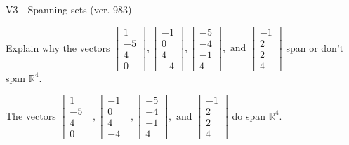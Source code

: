 \begin{exercise}
  \begin{exerciseTitle}V3 - Spanning sets (ver. 983)\end{exerciseTitle}
  \begin{exerciseStatement}
    Explain why the vectors \(\left[\begin{array}{r}
1 \\
-5 \\
4 \\
0
\end{array}\right] , \left[\begin{array}{r}
-1 \\
0 \\
4 \\
-4
\end{array}\right] , \left[\begin{array}{r}
-5 \\
-4 \\
-1 \\
4
\end{array}\right] , \text{ and } \left[\begin{array}{r}
-1 \\
2 \\
2 \\
4
\end{array}\right]\) span or don't span \(\mathbb{R}^4\). 
	


  \end{exerciseStatement}
  \begin{exerciseAnswer}
   The vectors \(\left[\begin{array}{r}
1 \\
-5 \\
4 \\
0
\end{array}\right] , \left[\begin{array}{r}
-1 \\
0 \\
4 \\
-4
\end{array}\right] , \left[\begin{array}{r}
-5 \\
-4 \\
-1 \\
4
\end{array}\right] , \text{ and } \left[\begin{array}{r}
-1 \\
2 \\
2 \\
4
\end{array}\right]\) 
  	 do  
	span \(\mathbb{R}^4\).
  


  \end{exerciseAnswer}
\end{exercise}
